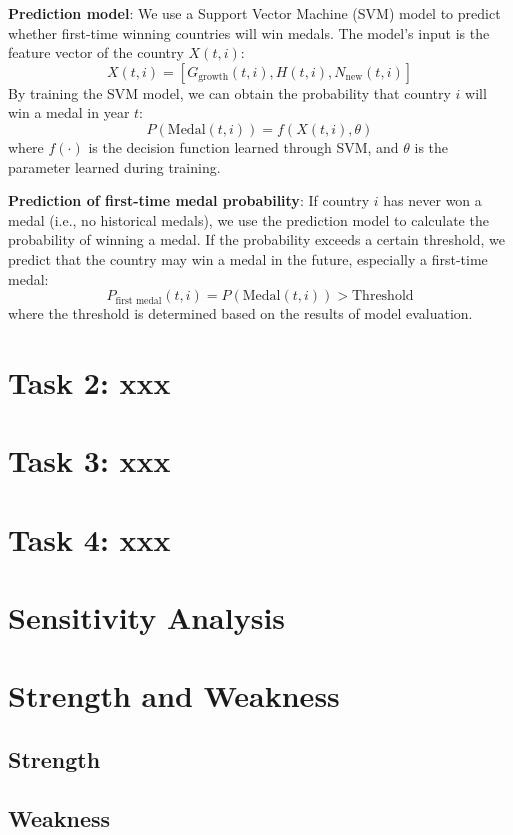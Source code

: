 \documentclass{mcmthesis}
\begin{document}
	 \textbf{Prediction model}:
	We use a Support Vector Machine (SVM) model to predict whether first-time winning countries will win medals. The model’s input is the feature vector of the country $X(t,i)$:
	\[
	X(t,i) = [G_{\text{growth}}(t,i), H(t,i), N_{\text{new}}(t,i)]
	\]
	By training the SVM model, we can obtain the probability that country $i$ will win a medal in year $t$:
	\[
	P(\text{Medal}(t,i)) = f(X(t,i), \theta)
	\]
	where $f(\cdot)$ is the decision function learned through SVM, and $\theta$ is the parameter learned during training.
	
	\textbf{Prediction of first-time medal probability}:
	If country $i$ has never won a medal (i.e., no historical medals), we use the prediction model to calculate the probability of winning a medal. If the probability exceeds a certain threshold, we predict that the country may win a medal in the future, especially a first-time medal:
	\[
	P_{\text{first medal}}(t,i) = P(\text{Medal}(t,i)) > \text{Threshold}
	\]
	where the threshold is determined based on the results of model evaluation.






\section{Task 2: xxx}

\section{Task 3: xxx}

\section{Task 4: xxx}

\section{Sensitivity Analysis}

\section{Strength and Weakness}
\subsection{Strength}
\subsection{Weakness}
\end{document}
